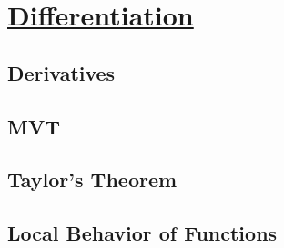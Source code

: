 \section[Differentiation]{\hyperlink{toc}{Differentiation}}

\subsection{Derivatives}

\subsection{MVT}

\subsection{Taylor's Theorem}

\subsection{Local Behavior of Functions}